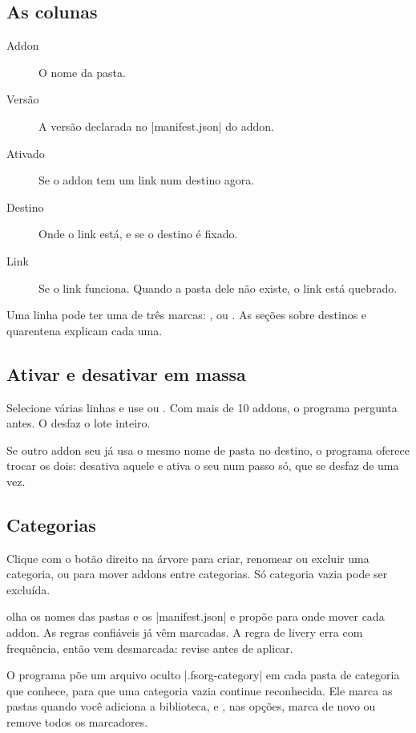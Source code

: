\documentclass[11pt,a4paper]{article}
\begin{document}
\subsection{As colunas}

\begin{description}
  \item[Addon] O nome da pasta.
  \item[Versão] A versão declarada no \where|manifest.json| do addon.
  \item[Ativado] Se o addon tem um link num destino agora.
  \item[Destino] Onde o link está, e se o destino é fixado.
  \item[Link] Se o link funciona. Quando a pasta dele não existe, o link está
    quebrado.
\end{description}

Uma linha pode ter uma de três marcas: ,  ou
. As seções sobre destinos e quarentena explicam cada uma.

\subsection{Ativar e desativar em massa}

Selecione várias linhas e use  ou . Com mais de 10 addons, o programa pergunta antes. O
 desfaz o lote inteiro.

Se outro addon seu já usa o mesmo nome de pasta no destino, o programa oferece
trocar os dois: desativa aquele e ativa o seu num passo só, que se desfaz de
uma vez.

\subsection{Categorias}

Clique com o botão direito na árvore para criar, renomear ou excluir uma
categoria, ou para mover addons entre categorias. Só categoria vazia pode ser
excluída.

 olha os nomes das pastas e os \where|manifest.json| e
propõe para onde mover cada addon. As regras confiáveis já vêm marcadas. A regra
de livery erra com frequência, então vem desmarcada: revise antes de aplicar.

O programa põe um arquivo oculto \where|.fsorg-category| em cada pasta de
categoria que conhece, para que uma categoria vazia continue reconhecida. Ele
marca as pastas quando você adiciona a biblioteca, e , nas
opções, marca de novo ou remove todos os marcadores.
\end{document}
